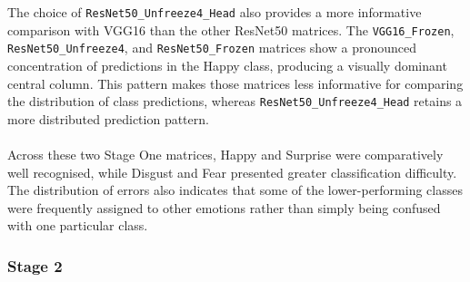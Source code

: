 \documentclass[12pt, a4paper]{report}
\let\oldsubsubsection\subsubsection
\renewcommand{\subsubsection}{%
    \Needspace{6\baselineskip}%
    \oldsubsubsection
}
\begin{document}
					The choice of \texttt{ResNet50\_Unfreeze4\_Head} also provides a more informative comparison with VGG16 than the other ResNet50 matrices. The \texttt{VGG16\_Frozen}, \texttt{ResNet50\_Unfreeze4}, and \texttt{ResNet50\_Frozen} matrices show a pronounced concentration of predictions in the Happy class, producing a visually dominant central column. This pattern makes those matrices less informative for comparing the distribution of class predictions, whereas \texttt{ResNet50\_Unfreeze4\_Head} retains a more distributed prediction pattern.\\\\
					Across these two Stage One matrices, Happy and Surprise were comparatively well recognised, while Disgust and Fear presented greater classification difficulty. The distribution of errors also indicates that some of the lower-performing classes were frequently assigned to other emotions rather than simply being confused with one particular class.
					
				\subsubsection{Stage 2}
					
\end{document}
